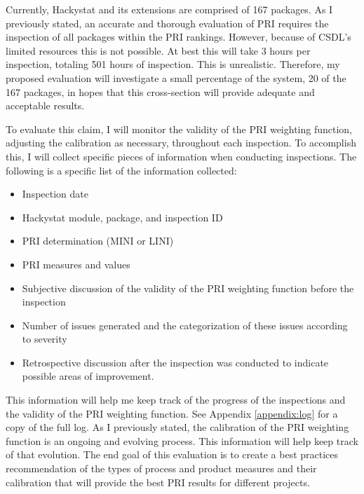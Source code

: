 Currently, Hackystat and its extensions are comprised of 167 packages. As I
previously stated, an accurate and thorough evaluation of PRI requires the
inspection of all packages within the PRI rankings. However, because of
CSDL's limited resources this is not possible. At best this will take 3
hours per inspection, totaling 501 hours of inspection. This is
unrealistic.  Therefore, my proposed evaluation will investigate a small
percentage of the system, 20 of the 167 packages, in hopes that this
cross-section will provide adequate and acceptable results.

\hspace*{1pt}

To evaluate this claim, I will monitor the validity of the PRI weighting
function, adjusting the calibration as necessary, throughout each
inspection. To accomplish this, I will collect specific pieces of
information when conducting inspections. The following is a specific list
of the information collected:

\begin{itemize}
\item Inspection date
\item Hackystat module, package, and inspection ID
\item PRI determination (MINI or LINI)
\item PRI measures and values
\item Subjective discussion of the validity of the PRI weighting function
  before the inspection
\item Number of issues generated and the categorization of these issues
  according to severity
\item Retrospective discussion after the inspection was conducted to
  indicate possible areas of improvement. 
\end{itemize}

This information will help me keep track of the progress of the inspections
and the validity of the PRI weighting function. See Appendix
\ref{appendix:log} for a copy of the full log. As I previously stated, the
calibration of the PRI weighting function is an ongoing and evolving
process.  This information will help keep track of that evolution.  The end
goal of this evaluation is to create a best practices recommendation of the
types of process and product measures and their calibration that will
provide the best PRI results for different projects.

